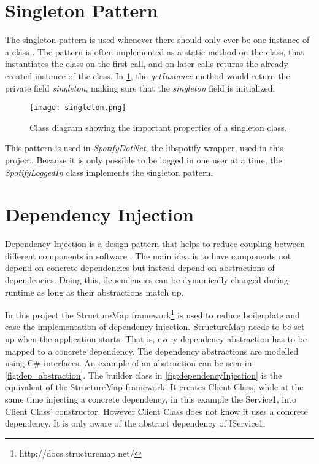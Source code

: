 \section{Singleton Pattern}

The singleton pattern is used whenever there should only ever be one
instance of a class \cite{skeet2013c}. The pattern is often implemented as a static
method on the class, that instantiates the class on the first call,
and on later calls returns the already created instance of the class. In
\cref{fig:singleton}, the \textit{getInstance} method would return the private field
\textit{singleton}, making sure that the \textit{singleton} field is initialized.

\begin{figure}[H]
  \centering
  \texttt{[image: singleton.png]}
  \caption{Class diagram showing the important properties of a
    singleton class.}\label{fig:singleton}
\end{figure}

This pattern is used in \textit{SpotifyDotNet}, the libspotify wrapper, used in
this project. Because it is only possible to be logged in one user at
a time, the \textit{SpotifyLoggedIn} class implements the singleton pattern.

\section{Dependency Injection}

Dependency Injection is a design pattern that helps to reduce coupling
between different components in software \cite{injection}. The main idea is
to have components not depend on concrete dependencies but instead
depend on abstractions of dependencies. Doing this, dependencies can
be dynamically changed during runtime as long as their abstractions
match up.

In this project the StructureMap framework\footnote{http://docs.structuremap.net/} is used to reduce
boilerplate and ease the implementation of dependency
injection. StructureMap needs to be set up when the application
starts. That is, every dependency abstraction has to be mapped to a
concrete dependency. The dependency abstractions are modelled using
C\# interfaces. An example of an abstraction can be seen in
\cref{fig:dep_abstraction}. The
builder class in \cref{fig:dependencyInjection} is the equivalent of the StructureMap
framework. It creates Client Class, while at the same time injecting a
concrete dependency, in this example the Service1, into Client Class' constructor. However Client
Class does not know it uses a concrete dependency. It is only aware of
the abstract dependency of IService1.

